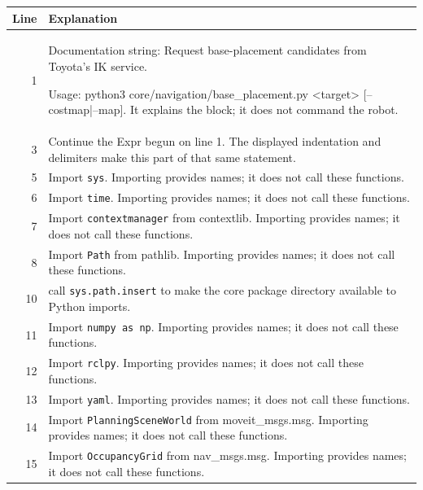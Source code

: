\documentclass[11pt,a4paper]{book}
\begin{document}
\begin{longtable}{r p{}}

\textbf{Line} & \textbf{Explanation} \\ \hline \endhead

1 & Documentation string: Request base-placement candidates from Toyota's IK service.

Usage: python3 core/navigation/base\_placement.py <target> [--costmap|--map]. It explains the block; it does not command the robot. \\

3 & Continue the Expr begun on line 1. The displayed indentation and delimiters make this part of that same statement. \\

5 & Import \texttt{sys}. Importing provides names; it does not call these functions. \\

6 & Import \texttt{time}. Importing provides names; it does not call these functions. \\

7 & Import \texttt{contextmanager} from contextlib. Importing provides names; it does not call these functions. \\

8 & Import \texttt{Path} from pathlib. Importing provides names; it does not call these functions. \\

10 & call \texttt{sys.path.insert} to make the core package directory available to Python imports. \\

11 & Import \texttt{numpy as np}. Importing provides names; it does not call these functions. \\

12 & Import \texttt{rclpy}. Importing provides names; it does not call these functions. \\

13 & Import \texttt{yaml}. Importing provides names; it does not call these functions. \\

14 & Import \texttt{PlanningSceneWorld} from moveit\_msgs.msg. Importing provides names; it does not call these functions. \\

15 & Import \texttt{OccupancyGrid} from nav\_msgs.msg. Importing provides names; it does not call these functions. \\


\end{longtable}
\end{document}
